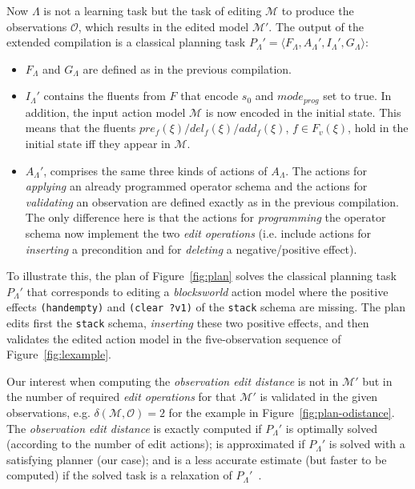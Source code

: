 \documentclass[3p,times]{elsarticle}
\newcommand{\tup}[1]{{\langle #1 \rangle}}
\begin{document}
Now $\Lambda$ is not a learning task but the task of editing $\mathcal{M}$ to produce the observations $\mathcal{O}$, which results in the edited model $\mathcal{M}'$. The output of the extended compilation is a classical planning task $P_{\Lambda}'=\tup{F_{\Lambda},A_{\Lambda}',I_{\Lambda}',G_{\Lambda}}$:

\begin{itemize}
\item $F_{\Lambda}$ and $G_{\Lambda}$ are defined as in the previous compilation.
\item $I_{\Lambda}'$ contains the fluents from $F$ that encode $s_0$ and $mode_{prog}$ set to true. In addition, the input action model $\mathcal{M}$ is now encoded in the initial state. This means that the fluents $pre_f(\xi)/del_f(\xi)/add_f(\xi)$, $f\in F_v(\xi)$, hold in the initial state iff they appear in $\mathcal{M}$.
\item $A_{\Lambda}'$, comprises the same three kinds of actions of $A_{\Lambda}$. The actions for {\em applying} an already programmed operator schema and the actions for {\em validating} an observation are defined exactly as in the previous compilation. The only difference here is that the actions for {\em programming} the operator schema now implement the two {\em edit operations} (i.e. include actions for {\em inserting} a precondition and for {\em deleting} a negative/positive effect).
\end{itemize}

To illustrate this, the plan of Figure~\ref{fig:plan} solves the classical planning task $P_{\Lambda}'$ that corresponds to editing a \emph{blocksworld} action model where the positive effects {\tt\small (handempty)} and {\tt\small (clear ?v1)} of the {\tt\small stack} schema are missing. The plan edits first the {\tt\small stack} schema, {\em inserting} these two positive effects, and then validates the edited action model in the five-observation sequence of Figure~\ref{fig:lexample}.

Our interest when computing the {\em observation edit distance} is not in $\mathcal{M}'$ but in the number of required {\em edit operations} for that $\mathcal{M}'$ is validated in the given observations, e.g. $\delta(\mathcal{M},\mathcal{O})=2$ for the example in Figure~\ref{fig:plan-odistance}. The {\em observation edit distance} is exactly computed if $P_{\Lambda}'$ is optimally solved (according to the number of edit actions); is approximated if $P_{\Lambda}'$ is solved with a satisfying planner (our case); and is a less accurate estimate (but faster to be computed) if the solved task is a relaxation of $P_{\Lambda}'$~\cite{bonet2001planning}.
\end{document}
